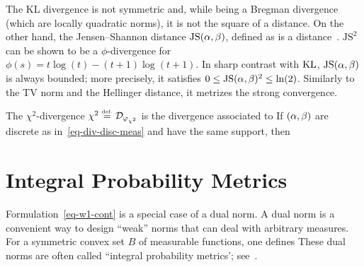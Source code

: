 \begin{example}
	The KL divergence is not symmetric and, while being a Bregman divergence (which are locally quadratic norms), it is not the square of a distance. On the other hand, the Jensen--Shannon distance $\text{JS}(\alpha,\beta)$, defined as
	is a distance~\citep{endres2003new,osterreicher2003new}. 
	$\text{JS}^2$ can be shown to be a $\phi$-divergence for $\phi(s) = t\log(t)-(t+1)\log(t+1)$.
	In sharp contrast with $\operatorname{KL}$, $\text{JS}(\alpha,\beta)$ is always bounded; more precisely, it satisfies $0 \leq \text{JS}(\alpha,\beta)^2 \leq \ln(2)$. 
	Similarly to the TV norm and the Hellinger distance, it metrizes the strong convergence. 
\end{example}



\begin{example}[$\chi^2$]\label{exmp-chisquare}
	The $\chi^2$-divergence $\chi^2 \eqdef \Divergm_{\phi_{\chi^2}}$ is the divergence associated to
	If $(\alpha,\beta)$ are discrete as in~\eqref{eq-div-disc-meas} and have the same support, then 
\end{example}


\section{Integral Probability Metrics}
\label{sec-dual-norms}


Formulation~\eqref{eq-w1-cont} is a special case of a dual norm. A dual norm is a convenient way to design ``weak'' norms that can deal with arbitrary measures. For a symmetric convex set $B$ of measurable functions, one defines 
These dual norms are often called ``integral probability metrics'; see~\citep{sriperumbudur2012empirical}.

